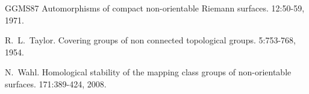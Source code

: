 \documentclass[english,11pt,leqno]{article}
\theoremstyle{definition}
\theoremstyle{remark}
\numberwithin{equation}{section}
\begin{document}
\begin{thebibliography}{GGMS87}
   Automorphisms of compact non-orientable Riemann surfaces.
   12:50-59, 1971. 


  R.~L.~Taylor.
 \newblock Covering groups of non connected topological groups.
  5:753-768, 1954. 
 
  N.~Wahl.
 \newblock Homological stability of the mapping class groups of non-orientable surfaces.
  171:389-424, 2008. 
 

\end{thebibliography}
\end{document}
